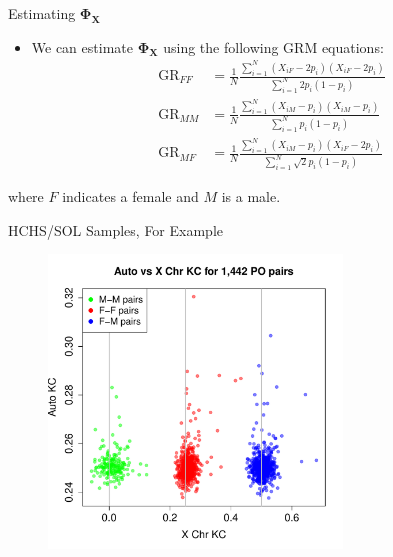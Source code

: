 \documentclass{beamer}
\begin{document}
\begin{frame}{Estimating $\mathbf{\Phi_X}$}
\begin{itemize}
\item We can estimate $\mathbf{\Phi_X}$ using the following GRM equations:
\begin{align*}
\mbox{GR}_{FF}&=\frac{1}{N}\frac{\sum_{i=1}^N (X_{iF}-2p_i)(X_{iF}-2p_i)}{\sum_{i=1}^N 2p_i(1-p_i)}\\
\mbox{GR}_{MM}&=\frac{1}{N} \frac{\sum_{i=1}^N(X_{iM}-p_i)(X_{iM}-p_i)}{\sum_{i=1}^Np_i(1-p_i)}\\
\mbox{GR}_{MF}&=\frac{1}{N}\frac{\sum_{i=1}^N (X_{iM}-p_i)(X_{iF}-2p_i)}{\sum_{i=1}^N \sqrt{2}p_i(1-p_i)}
\end{align*}
\end{itemize}where $F$ indicates a female and $M$ is a male.
\end{frame}

\begin{frame}{HCHS/SOL Samples, For Example}
\begin{figure}
\centering
\includegraphics[height=7.8cm]{../kc_xPrunedvsAuto_poPairs_xAdj.pdf}
\end{figure}
\end{frame}
\end{document}

